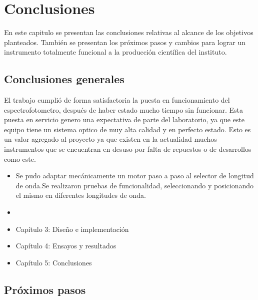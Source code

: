 
\chapter{Conclusiones} %

\label{Chapter5} %
En este capitulo se presentan las conclusiones relativas al alcance de los objetivos planteados.
También se presentan los próximos pasos y cambios para lograr un instrumento totalmente funcional a la producción científica del instituto.



\section{Conclusiones generales }

El trabajo cumplió de forma satisfactoria la puesta en funcionamiento del espectrofotometro, después de haber estado mucho tiempo sin funcionar.
Esta puesta en servicio genero una expectativa de parte del laboratorio, ya que este equipo tiene un sistema optico de muy alta calidad y en perfecto estado.
Esto es un valor agregado al proyecto ya que existen en la actualidad muchos instrumentos que se encuentran en desuso por falta de repuestos o de desarrollos como este.


\begin{itemize}
\item Se pudo adaptar mecánicamente un motor paso a paso al selector de longitud de onda.Se realizaron pruebas de funcionalidad, seleccionando y posicionando el mismo en diferentes longitudes de onda.
   
\item  
\item Capítulo 3: Diseño e implementación
\item Capítulo 4: Ensayos y resultados
\item Capítulo 5: Conclusiones
\end{itemize}




\section{Próximos pasos}

